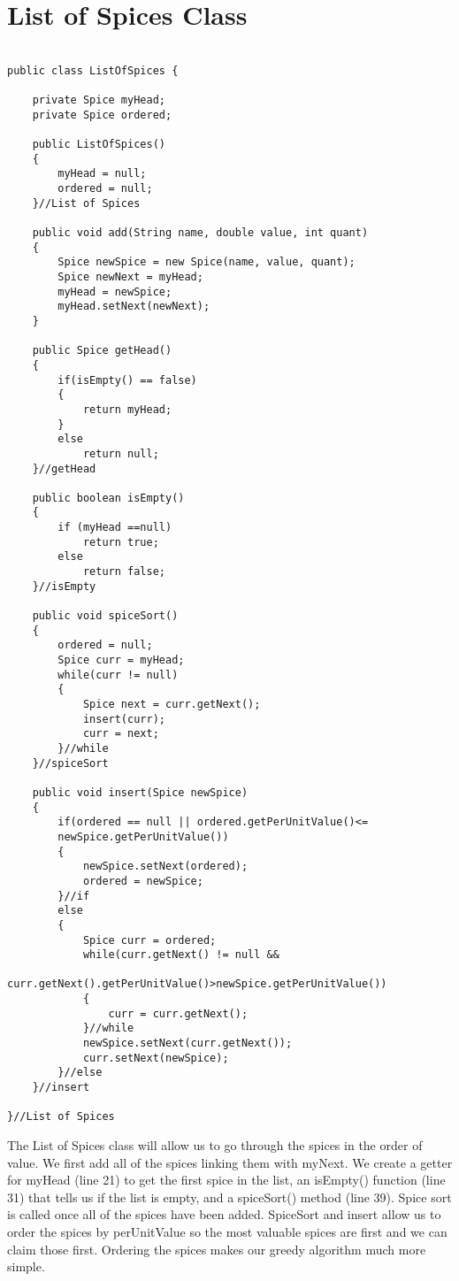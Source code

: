 \documentclass{article}
\begin{document}
\small
\section{List of Spices Class}
\begin{lstlisting}[frame =single,
backgroundcolor = \color{grey!12}]

public class ListOfSpices {

	private Spice myHead;
	private Spice ordered;
	
	public ListOfSpices()
	{
		myHead = null;
		ordered = null;
	}//List of Spices
	
	public void add(String name, double value, int quant)
	{
		Spice newSpice = new Spice(name, value, quant);
		Spice newNext = myHead;
		myHead = newSpice;
		myHead.setNext(newNext);
	}
	
	public Spice getHead()
	{
		if(isEmpty() == false)
		{
			return myHead;
		}
		else
			return null;
	}//getHead
	
	public boolean isEmpty()
	{
		if (myHead ==null)
			return true;
		else
			return false;
	}//isEmpty
	
	public void spiceSort()
	{
		ordered = null;
		Spice curr = myHead;
		while(curr != null)
		{
			Spice next = curr.getNext();
			insert(curr);
			curr = next;
		}//while
	}//spiceSort
	
	public void insert(Spice newSpice)
	{
		if(ordered == null || ordered.getPerUnitValue()<=
		newSpice.getPerUnitValue())
		{
			newSpice.setNext(ordered);
			ordered = newSpice;
		}//if
		else
		{
			Spice curr = ordered;
			while(curr.getNext() != null &&
			curr.getNext().getPerUnitValue()>newSpice.getPerUnitValue())
			{
				curr = curr.getNext();
			}//while
			newSpice.setNext(curr.getNext());
			curr.setNext(newSpice);
		}//else
	}//insert
	
}//List of Spices
\end{lstlisting}
\large
The List of Spices class will allow us to go through the spices in the order of value. We first add all of the spices linking them with myNext. We create a getter for myHead (line 21) to get the first spice in the list, an isEmpty() function (line 31) that tells us if the list is empty, and a spiceSort() method (line 39). Spice sort is called once all of the spices have been added. SpiceSort and insert allow us to order the spices by perUnitValue so the most valuable spices are first and we can claim those first. Ordering the spices makes our greedy algorithm much more simple. 

\small
\end{document}
